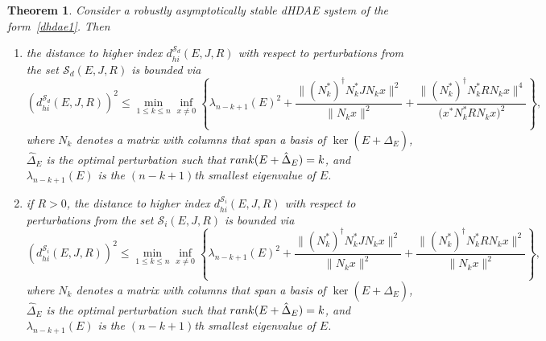\documentclass[10pt,a4paper]{amsart}
\newtheorem{theorem}{Theorem}
\newcommand{\rank}     {\mathop{\rm rank}\nolimits}
\begin{document}
\begin{theorem}\label{thm:dist-hiEJR}
    Consider a robustly asymptotically stable dHDAE system of the form~\eqref{dhdae1}. Then
    \begin{enumerate}
        \item the distance to higher index $d_{hi}^{\mathcal S_d}(E,J,R)$ with respect to perturbations from the set $\mathcal S_{d}(E,J,R)$ is bounded via
        \begin{equation}
            (d_{hi}^{\mathcal S_d}(E,J,R))^2 \leq \min_{1 \leq k \leq n} \inf_{x\neq 0} \left\{ \lambda_{n-k+1}(E)^2 + \frac{\|(N_k^*)^{\dagger} N_k^* J N_k x\|^2}{\|N_k x\|^2} + \frac{\|(N_k^*)^{\dagger} N_k^* R N_k x\|^4} {\big(x^* N_k^* R N_k x\big)^2} \right\},
        \end{equation}
        where $N_k$ denotes a  matrix with  columns that span a basis of $\ker(E+\hat \Delta_E)$, $\hat \Delta_E$ is the optimal perturbation such that $\rank (E+\hat \Delta_E)=k$,
         and $\lambda_{n-k+1}(E)$ is the $(n-k+1)$th smallest eigenvalue of $E$.
        \item if $R>0$, the distance to higher index $d_{hi}^{\mathcal S_i}(E,J,R)$ with respect to perturbations from the set $\mathcal S_{i}(E,J,R)$ is bounded via
        \begin{equation}
            (d_{hi}^{\mathcal S_i}(E,J,R))^2 \leq \min_{1\leq k \leq n}\inf_{x\neq 0} \left\{ \lambda_{n-k+1}(E)^2 + \frac{\|(N_k^*)^{\dagger} N_k^* J N_k x\|^2}{\|N_k x\|^2} + \frac{\|(N_k^*)^{\dagger} N_k^* R N_k x\|^2} {\|N_k x\|^2} \right\},
        \end{equation}
        where $N_k$ denotes a  matrix with  columns that span a basis of $\ker(E+\hat \Delta_E)$, $\hat \Delta_E$ is the optimal perturbation such that $\rank (E+\hat \Delta_E)=k$, and $\lambda_{n-k+1}(E)$ is the $(n-k+1)$th smallest eigenvalue of $E$.
    \end{enumerate}
\end{theorem}
\end{document}
